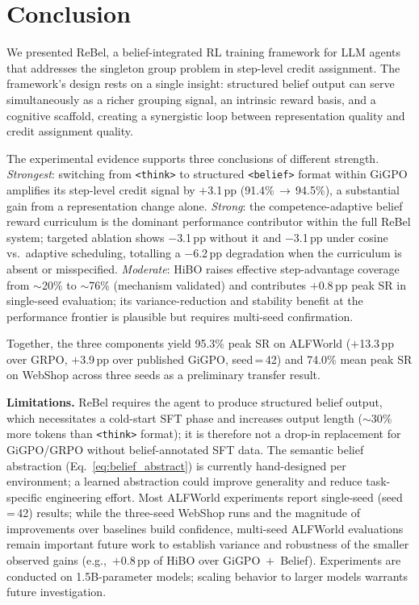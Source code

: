 \documentclass{article}
\begin{document}



\section{Conclusion}
\label{sec:conclusion}

We presented ReBel, a belief-integrated RL training framework for LLM agents
that addresses the singleton group problem in step-level credit assignment.
The framework's design rests on a single insight: structured belief output can
serve simultaneously as a richer grouping signal, an intrinsic reward basis,
and a cognitive scaffold, creating a synergistic loop between representation
quality and credit assignment quality.

The experimental evidence supports three conclusions of different strength.
\emph{Strongest}: switching from \texttt{<think>} to structured \texttt{<belief>}
format within GiGPO amplifies its step-level credit signal by $+$3.1\,pp
(91.4\%\,$\to$\,94.5\%), a substantial gain from a representation change alone.
\emph{Strong}: the competence-adaptive belief reward curriculum is the dominant
performance contributor within the full ReBel system; targeted ablation shows
$-$3.1\,pp without it and $-$3.1\,pp under cosine vs.\ adaptive scheduling,
totalling a $-$6.2\,pp degradation when the curriculum is absent or misspecified.
\emph{Moderate}: HiBO raises effective step-advantage coverage from $\sim$20\%
to $\sim$76\% (mechanism validated) and contributes $+$0.8\,pp peak SR in single-seed
evaluation; its variance-reduction and stability benefit at the performance frontier
is plausible but requires multi-seed confirmation.

Together, the three components yield 95.3\% peak SR on ALFWorld ($+$13.3\,pp over GRPO,
$+$3.9\,pp over published GiGPO, seed\,=\,42) and 74.0\% mean peak SR on WebShop
across three seeds as a preliminary transfer result.

\textbf{Limitations.}
ReBel requires the agent to produce structured belief output, which necessitates
a cold-start SFT phase and increases output length ($\sim$30\% more tokens
than \texttt{<think>} format); it is therefore not a drop-in replacement for
GiGPO/GRPO without belief-annotated SFT data.
The semantic belief abstraction (Eq.~\ref{eq:belief_abstract}) is currently
hand-designed per environment; a learned abstraction could improve generality
and reduce task-specific engineering effort.
Most ALFWorld experiments report single-seed (seed\,=\,42) results; while the
three-seed WebShop runs and the magnitude of improvements over baselines build
confidence, multi-seed ALFWorld evaluations remain important future work to
establish variance and robustness of the smaller observed gains
(e.g.,~$+$0.8\,pp of HiBO over GiGPO~$+$~Belief).
Experiments are conducted on 1.5B-parameter models; scaling behavior to larger
models warrants future investigation.
\end{document}
